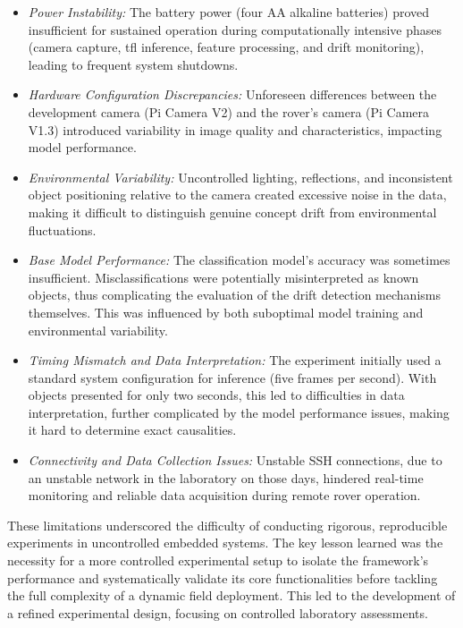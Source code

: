\begin{itemize}[noitemsep, topsep=0pt]
    \item \textit{Power Instability:} The battery power (four AA alkaline batteries) proved insufficient for sustained operation during computationally intensive phases (camera capture, \gls{tfl} inference, feature processing, and drift monitoring), leading to frequent system shutdowns.
    \item \textit{Hardware Configuration Discrepancies:} Unforeseen differences between the development camera (Pi Camera V2) and the rover's camera (Pi Camera V1.3) introduced variability in image quality and characteristics, impacting model performance.
    \item \textit{Environmental Variability:} Uncontrolled lighting, reflections, and inconsistent object positioning relative to the camera created excessive noise in the data, making it difficult to distinguish genuine concept drift from environmental fluctuations.
    \item \textit{Base Model Performance:} The classification model's accuracy was sometimes insufficient. Misclassifications were potentially misinterpreted as known objects, thus complicating the evaluation of the drift detection mechanisms themselves. This was influenced by both suboptimal model training and environmental variability.
    \item \textit{Timing Mismatch and Data Interpretation:} The experiment initially used a standard system configuration for inference (five frames per second). With objects presented for only two seconds, this led to difficulties in data interpretation, further complicated by the model performance issues, making it hard to determine exact causalities.
    \item \textit{Connectivity and Data Collection Issues:} Unstable SSH connections, due to an unstable network in the laboratory on those days, hindered real-time monitoring and reliable data acquisition during remote rover operation.
\end{itemize}

These limitations underscored the difficulty of conducting rigorous, reproducible experiments in uncontrolled embedded systems. The key lesson learned was the necessity for a more controlled experimental setup to isolate the framework's performance and systematically validate its core functionalities before tackling the full complexity of a dynamic field deployment. This led to the development of a refined experimental design, focusing on controlled laboratory assessments.


